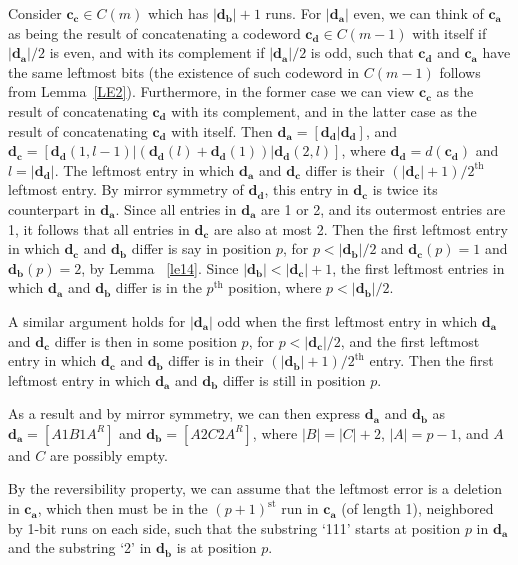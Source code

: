 Consider $\mathbf{c_c} \in C(m)$ which has $|\mathbf{d_b}|+1$
runs. For $|\mathbf{d_a}|$ even, we can think of $\mathbf{c_a}$ as
being the result of concatenating a codeword $\mathbf{c_d} \in
C(m-1)$ with itself if $|\mathbf{d_a}|/2$ is even, and with its
complement if $|\mathbf{d_a}|/2$ is odd, such that $\mathbf{c_d}$
and $\mathbf{c_a}$ have the same leftmost bits (the existence of
such codeword in $C(m-1)$ follows from Lemma~\ref{LE2}).
Furthermore, in the former case we can view $\mathbf{c_c}$ as the
result of concatenating $\mathbf{c_d}$ with its complement, and in
the latter case as the result of concatenating $\mathbf{c_d}$ with
itself. Then $\mathbf{d_a}=[\mathbf{d_d}|\mathbf{d_d}]$, and
$\mathbf{d_c}=[\mathbf{d_d}(1,l-1)|(\mathbf{d_d}(l)+\mathbf{d_d}(1))|\mathbf{d_d}(2,l)]$,
where $\mathbf{d_d}=d(\mathbf{c_d})$ and $l=|\mathbf{d_d}|$. The
leftmost entry in which $\mathbf{d_a}$ and $\mathbf{d_c}$ differ
is their $(|\mathbf{d_c}|+1)/2^{\text{th}}$ leftmost entry. By
mirror symmetry of $\mathbf{d_d}$, this entry in $\mathbf{d_c}$ is
twice its counterpart in $\mathbf{d_a}$. Since all entries in
$\mathbf{d_a}$ are 1 or 2, and its outermost entries are 1, it
follows that all entries in $\mathbf{d_c}$ are also at most 2.
Then the first leftmost entry in which $\mathbf{d_c}$ and
$\mathbf{d_b}$ differ is say in position $p$, for
$p<|\mathbf{d_b}|/2$ and $\mathbf{d_c}(p)=1$ and
$\mathbf{d_b}(p)=2$, by Lemma ~\ref{le14}. Since $|\mathbf{d_b}| <
|\mathbf{d_c}|+1$, the first leftmost entries in which
$\mathbf{d_a}$ and $\mathbf{d_b}$ differ is in the $p^{\text{th}}$
position, where $p < |\mathbf{d_b}|/2$.

A similar argument holds for $|\mathbf{d_a}|$ odd when the first
leftmost entry in which $\mathbf{d_a}$ and $\mathbf{d_c}$ differ
is then in some position $p$, for $p < |\mathbf{d_c}|/2$, and the
first leftmost entry in which $\mathbf{d_c}$ and $\mathbf{d_b}$
differ is in their $(|\mathbf{d_b}|+1)/2^{\text{th}}$ entry. Then
the first leftmost entry in which $\mathbf{d_a}$ and
$\mathbf{d_b}$ differ is still in position $p$.


As a result and by mirror symmetry, we can then express
$\mathbf{d_a}$ and $\mathbf{d_b}$ as $\mathbf{d_a}=[A1B1A^R]$ and
$\mathbf{d_b}=[A2C2A^R]$, where $|B|=|C|+2$, $|A|=p-1$, and $A$
and $C$ are possibly empty.

By the reversibility property, we can assume that the leftmost
error is a deletion in $\mathbf{c_a}$, which then must be in the
$(p+1)^{\text{st}}$ run in $\mathbf{c_a}$ (of length 1),
neighbored by 1-bit runs on each side, such that the substring
`111' starts at position $p$ in $\mathbf{d_a}$ and the substring
`2' in $\mathbf{d_b}$ is at position $p$.

